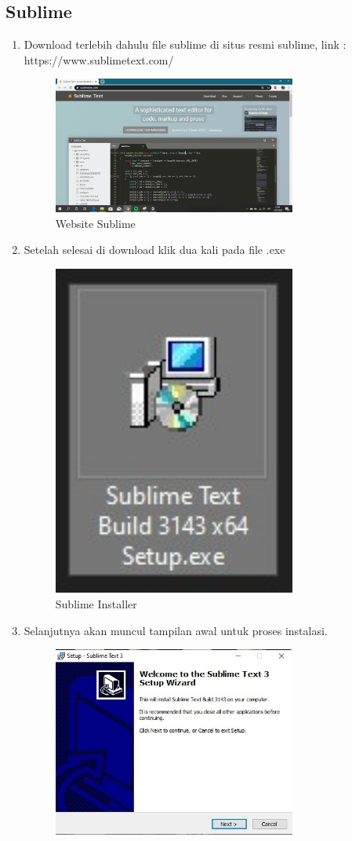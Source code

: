 \subsection{Sublime}
\begin{enumerate}
\item Download terlebih dahulu file sublime di situs resmi sublime, link :  https://www.sublimetext.com/
	\begin{figure}[H]
		\includegraphics[width=8cm]{figures/instalasi/sb1.jpg}
		\centering
		\caption{Website Sublime}
	\end{figure}
\item Setelah selesai di download klik dua kali pada file .exe
	\begin{figure}[H]
		\includegraphics[width=8cm]{figures/instalasi/sb2.jpg}
		\centering
		\caption{Sublime Installer}
	\end{figure}
\item Selanjutnya akan muncul tampilan awal untuk proses instalasi.
	\begin{figure}[H]
		\includegraphics[width=8cm]{figures/instalasi/sb3.jpg}

\end{figure}
\end{enumerate}
